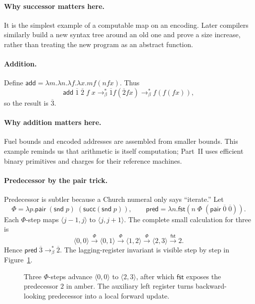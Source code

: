 \paragraph{Why successor matters here.}
It is the simplest example of a computable map on an encoding.  Later
compilers similarly build a new syntax tree around an old one and prove a
size increase, rather than treating the new program as an abstract function.

\paragraph{Addition.}
Define
\(\mathsf{add}=\lambda m.\lambda n.\lambda f.\lambda x.mf(nfx)\).  Thus
\[
 \mathsf{add}\;\overline1\;\overline2\;f\;x
 \to_\beta^*\overline1 f(\overline2 f x)
 \to_\beta^*f(f(fx)),
\]
so the result is \(\overline3\).

\paragraph{Why addition matters here.}
Fuel bounds and encoded addresses are assembled from smaller bounds.  This
example reminds us that arithmetic is itself computation; Part~II uses
efficient binary primitives and charges for their reference machines.

\paragraph{Predecessor by the pair trick.}
Predecessor is subtler because a Church numeral only says ``iterate.''  Let
\[
 \Phi=\lambda p.\mathsf{pair}\;(\mathsf{snd}\;p)
                 \;(\mathsf{succ}(\mathsf{snd}\;p)),
 \qquad
 \mathsf{pred}=\lambda n.\mathsf{fst}
   (n\;\Phi\;(\mathsf{pair}\;\overline0\;\overline0)).
\]
Each \(\Phi\)-step maps \(\langle j-1,j\rangle\) to
\(\langle j,j+1\rangle\).  The complete small calculation for three is
\[
 \langle0,0\rangle\xrightarrow{\Phi}\langle0,1\rangle
 \xrightarrow{\Phi}\langle1,2\rangle
 \xrightarrow{\Phi}\langle2,3\rangle
 \xrightarrow{\mathsf{fst}}2.
\]
Hence \(\mathsf{pred}\;\overline3\to_\beta^*\overline2\).
The lagging-register invariant is visible step by step in
Figure~\ref{fig:pred-ladder}.

\begin{figure}[t]
\centering

\caption{Three $\Phi$-steps advance $\langle0,0\rangle$ to $\langle2,3\rangle$, after which $\mathsf{fst}$ exposes the predecessor $2$ in amber.  The auxiliary left register turns backward-looking predecessor into a local forward update.}
\label{fig:pred-ladder}
\end{figure}

